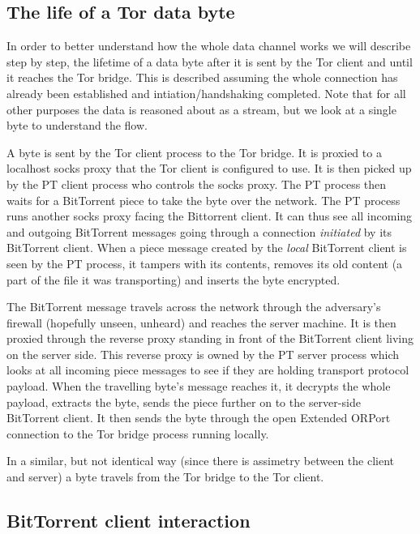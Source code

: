\documentclass[11pt]{book} %
\begin{document}
\subsection{The life of a Tor data byte}

In order to better understand how the whole data channel works we will describe step by step, the lifetime of a data byte after it is sent by the Tor client and until it reaches the Tor bridge. This is described assuming the whole connection has already been established and intiation/handshaking completed. Note that for all other purposes the data is reasoned about as a stream, but we look at a single byte to understand the flow.

A byte is sent by the Tor client process to the Tor bridge. It is proxied to a localhost socks proxy that the Tor client is configured to use. It is then picked up by the PT client process who controls the socks proxy. The PT process then waits for a BitTorrent piece to take the byte over the network. The PT process runs another socks proxy facing the Bittorrent client. It can thus see all incoming and outgoing BitTorrent messages going through a connection \textit{initiated} by its BitTorrent client. When a piece message created by the \textit{local} BitTorrent client is seen by the PT process, it tampers with its contents, removes its old content (a part of the file it was transporting) and inserts the byte encrypted.  

The BitTorrent message travels across the network through the adversary's firewall (hopefully unseen, unheard) and reaches the server machine. It is then proxied through the reverse proxy standing in front of the BitTorrent client living on the server side. This reverse proxy is owned by the PT server process which looks at all incoming piece messages to see if they are holding transport protocol payload. When the travelling byte's message reaches it, it decrypts the whole payload, extracts the byte, sends the piece further on to the server-side BitTorrent client. It then sends the byte through the open Extended ORPort connection to the Tor bridge process running locally.

In a similar, but not identical way (since there is assimetry between the client and server) a byte travels from the Tor bridge to the Tor client.

\subsection{BitTorrent client interaction}
\end{document}
